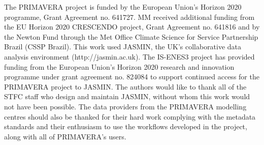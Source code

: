 \documentclass[gmd, manuscript]{copernicus}
\begin{document}


\begin{acknowledgements}
The PRIMAVERA project is funded by the European Union's Horizon 2020 programme, Grant Agreement no. 641727. MM received additional funding from the EU Horizon 2020 CRESCENDO project, Grant Agreement no. 641816 and by the Newton Fund through the Met Office Climate Science for Service Partnership Brazil (CSSP Brazil). This work used JASMIN, the UK's collaborative data analysis environment (http://jasmin.ac.uk). The IS-ENES3 project has provided funding from the European Union’s Horizon 2020 research and innovation programme under grant agreement no. 824084 to support continued access for the PRIMAVERA project to JASMIN. The authors would like to thank all of the STFC staff who design and maintain JASMIN, without whom this work would not have been possible. The data providers from the PRIMAVERA modelling centres should also be thanked for their hard work complying with the metadata standards and their enthusiasm to use the workflows developed in the project, along with all of PRIMAVERA's users.
\end{acknowledgements}



%
%
%





\end{document}
